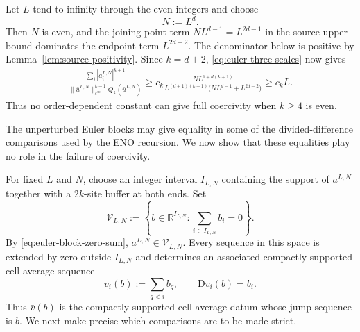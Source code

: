 \documentclass[11pt]{amsart}
\theoremstyle{plain}
\theoremstyle{definition}
\theoremstyle{remark}
\numberwithin{equation}{section}
\theoremstyle{plain}
\begin{document}
Let $L$ tend to infinity through the even integers and choose
\begin{equation}\label{eq:euler-number-of-blocks}
	N:=L^d.
\end{equation}
Then $N$ is even, and the joining-point term
$NL^{d-1}=L^{2d-1}$ in the source upper bound dominates the endpoint term
$L^{2d-2}$.  The denominator below is positive by
Lemma~\ref{lem:source-positivity}.  Since $k=d+2$,
\eqref{eq:euler-three-scales} now gives
\begin{align}
	\frac{\displaystyle\sum_i|a_i^{L,N}|^{k+1}}
	{\displaystyle
		\|\bar u^{L,N}\|_{\ell^\infty}^{k-1}
		Q_k(\bar u^{L,N})}
	\ge
	c_k\frac{NL^{1+d(k+1)}}
	{L^{(d+1)(k-1)}\bigl(NL^{d-1}+L^{2d-2}\bigr)}
	\ge c_kL.
	\label{eq:euler-divergent-quotient}
\end{align}
Thus no order-dependent constant can give full coercivity when $k\ge4$ is
even.

The unperturbed Euler blocks may give equality in some of the
divided-difference comparisons used by the ENO recursion.  We now show that
these equalities play no role in the failure of coercivity.

For fixed $L$ and $N$, choose an integer interval $I_{L,N}$ containing the
support of $a^{L,N}$ together with a $2k$-site buffer at both ends.  Set
\begin{equation}\label{eq:zero-sum-perturbation-space}
	\mathcal V_{L,N}
	:=\left\{b\in\mathbb R^{I_{L,N}}:
	\sum_{i\in I_{L,N}}b_i=0\right\}.
\end{equation}
By \eqref{eq:euler-block-zero-sum}, $a^{L,N}\in\mathcal V_{L,N}$.  Every
sequence in this space is extended by zero outside $I_{L,N}$ and determines
an associated compactly supported cell-average sequence
\begin{equation}\label{eq:perturbation-primitive}
	\bar v_i(b):=\sum_{q<i}b_q,
	\qquad \mathrm D\bar v_i(b)=b_i.
\end{equation}
Thus $\bar v(b)$ is the compactly supported cell-average datum whose jump
sequence is $b$.  We next make precise which comparisons are to be made
strict.
\end{document}
